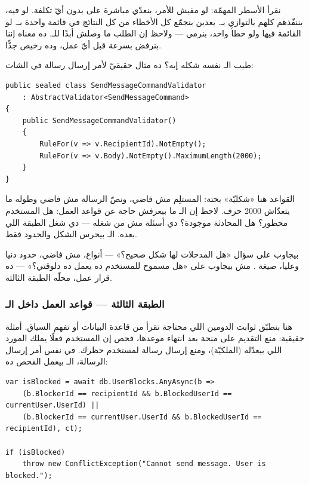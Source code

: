 نقرأ الأسطر المهمّة: لو مفيش  للأمر، بنعدّي مباشرة على  بدون أيّ تكلفة. لو فيه، بننفّذهم كلهم بالتوازي بـ. بعدين بنجمّع كل الأخطاء من كل النتائج في قائمة واحدة بـ. لو القائمة فيها ولو خطأ واحد، بنرمي  — ولاحظ إن الطلب ما وصلش أبدًا للـ. ده معناه إننا بنرفض بسرعة قبل أيّ عمل، وده رخيص جدًّا.

طيب الـ نفسه شكله إيه؟ ده مثال حقيقيّ لأمر إرسال رسالة في الشات:

\begin{english}
\begin{lstlisting}[language={[Sharp]C}]
public sealed class SendMessageCommandValidator
    : AbstractValidator<SendMessageCommand>
{
    public SendMessageCommandValidator()
    {
        RuleFor(v => v.RecipientId).NotEmpty();
        RuleFor(v => v.Body).NotEmpty().MaximumLength(2000);
    }
}
\end{lstlisting}
\end{english}

القواعد هنا «شكليّة» بحتة: المستلِم مش فاضي، ونصّ الرسالة مش فاضي وطوله ما يتعدّاش 2000 حرف. لاحظ إن الـ ما بيعرفش حاجة عن قواعد العمل: هل المستخدم محظور؟ هل المحادثة موجودة؟ دي أسئلة مش من شغله — دي شغل الطبقة اللي بعده. الـ بيحرس الشكل والحدود فقط.

\begin{keyp}
 بيجاوب على سؤال «هل المدخلات لها شكل صحيح؟» — أنواع، مش فاضي، حدود دنيا وعليا، صيغة . مش بيجاوب على «هل مسموح للمستخدم ده يعمل ده دلوقتي؟» — ده قرار عمل، محلّه الطبقة الثالثة.
\end{keyp}

\subsubsection{الطبقة الثالثة — قواعد العمل داخل الـ}

هنا بنطبّق ثوابت الدومين اللي محتاجة تقرأ من قاعدة البيانات أو تفهم السياق. أمثلة حقيقية: منع التقديم على منحة بعد انتهاء موعدها، فحص إن المستخدم فعلًا يملك المورد اللي بيعدّله (الملكيّة)، ومنع إرسال رسالة لمستخدم حظرك. في نفس أمر إرسال الرسالة، الـ بيعمل الفحص ده:

\begin{english}
\begin{lstlisting}[language={[Sharp]C}]
var isBlocked = await db.UserBlocks.AnyAsync(b =>
    (b.BlockerId == recipientId && b.BlockedUserId == currentUser.UserId) ||
    (b.BlockerId == currentUser.UserId && b.BlockedUserId == recipientId), ct);

if (isBlocked)
    throw new ConflictException("Cannot send message. User is blocked.");
\end{lstlisting}
\end{english}

